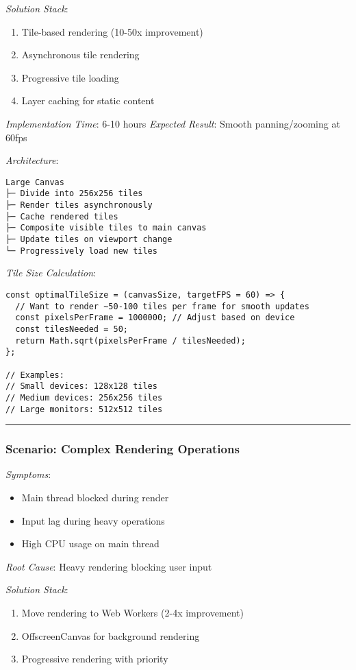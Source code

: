\documentclass[11pt]{article}
\begin{document}
\emph{Solution Stack}:
\begin{enumerate}
\item Tile-based rendering (10-50x improvement)
\item Asynchronous tile rendering
\item Progressive tile loading
\item Layer caching for static content
\end{enumerate}

\emph{Implementation Time}: 6-10 hours
\emph{Expected Result}: Smooth panning/zooming at 60fps

\emph{Architecture}:
\begin{verbatim}
Large Canvas
├─ Divide into 256x256 tiles
├─ Render tiles asynchronously
├─ Cache rendered tiles
├─ Composite visible tiles to main canvas
├─ Update tiles on viewport change
└─ Progressively load new tiles
\end{verbatim}

\emph{Tile Size Calculation}:
\begin{verbatim}
const optimalTileSize = (canvasSize, targetFPS = 60) => {
  // Want to render ~50-100 tiles per frame for smooth updates
  const pixelsPerFrame = 1000000; // Adjust based on device
  const tilesNeeded = 50;
  return Math.sqrt(pixelsPerFrame / tilesNeeded);
};

// Examples:
// Small devices: 128x128 tiles
// Medium devices: 256x256 tiles
// Large monitors: 512x512 tiles
\end{verbatim}

\noindent\rule{\textwidth}{0.5pt}
\subsubsection{Scenario: Complex Rendering Operations}
\label{sec:org6ca4847}

\emph{Symptoms}:
\begin{itemize}
\item Main thread blocked during render
\item Input lag during heavy operations
\item High CPU usage on main thread
\end{itemize}

\emph{Root Cause}: Heavy rendering blocking user input

\emph{Solution Stack}:
\begin{enumerate}
\item Move rendering to Web Workers (2-4x improvement)
\item OffscreenCanvas for background rendering
\item Progressive rendering with priority
\end{enumerate}
\end{document}
